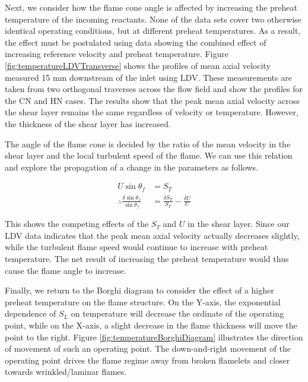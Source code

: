 Next, we consider how the flame cone angle is affected by increasing the preheat temperature of the incoming reactants.
None of the data sets cover two otherwise identical operating conditions, but at different preheat temperatures.
As a result, the effect must be postulated using data showing the combined effect of increasing reference velocity and preheat temperature.
Figure \ref{fig:temperatureLDVTransverse} shows the profiles of mean axial velocity measured 15 mm downstream of the inlet using LDV.
These measurements are taken from two orthogonal traverses across the flow field and show the profiles for the CN and HN cases.
The results show that the peak mean axial velocity across the shear layer remains the same regardless of velocity or temperature.
However, the thickness of the shear layer has increased.



The angle of the flame cone is decided by the ratio of the mean velocity in the shear layer and the local turbulent speed of the flame.
We can use this relation and explore the propagation of a change in the parameters as follows.

\begin{align}
  U \sin \theta_f &= S_T \nonumber \\
  \therefore \frac{ \delta \sin \theta_f }{ \sin \theta_f } &= \frac{ \delta S_T }{ S_T } - \frac{ \delta U }{ U }
\end{align}

This shows the competing effects of the \(S_T\) and \(U\) in the shear layer.
Since our LDV data indicates that the peak mean axial velocity actually decreases slightly, while the turbulent flame speed would continue to increase with preheat temperature.
The net result of increasing the preheat temperature would thus cause the flame angle to increase.

Finally, we return to the Borghi diagram to consider the effect of a higher preheat temperature on the flame structure.
On the Y-axis, the exponential dependence of \(S_L\) on temperature will decrease the ordinate of the operating point, while on the X-axis, a slight decrease in the flame thickness will move the point to the right.
Figure \ref{fig:temperatureBorghiDiagram} illustrates the direction of movement of such an operating point.
The down-and-right movement of the operating point drives the flame regime away from broken flamelets and closer towards wrinkled/laminar flames.



